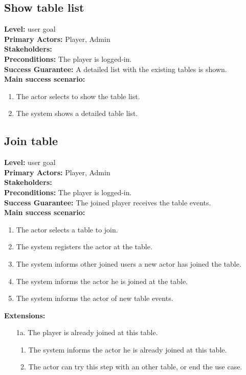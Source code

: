 \documentclass[a4paper,11pt]{report}
\begin{document}
\subsection{Show table list}
\textbf{Level:} user goal \\
\textbf{Primary Actors:} Player, Admin \\
\textbf{Stakeholders:} \\
\textbf{Preconditions:} The player is logged-in.\\
\textbf{Success Guarantee:} A detailed list with the existing tables is shown.\\
\textbf{Main success scenario:} 
\begin{enumerate}
\item The actor selects to show the table list.
\item The system shows a detailed table list.
\end{enumerate}

\subsection{Join table}
\textbf{Level:} user goal \\
\textbf{Primary Actors:} Player, Admin \\
\textbf{Stakeholders:} \\
\textbf{Preconditions:} The player is logged-in.\\
\textbf{Success Guarantee:} The joined player receives the table events. \\
\textbf{Main success scenario:} 
\begin{enumerate}
\item The actor selects a table to join. 
\item The system registers the actor at the table. 
\item The system informs other joined users a new actor has joined the table.
\item The system informs the actor he is joined at the table.
\item The system informs the actor of new table events.
\end{enumerate}
\textbf{Extensions:}
\begin{itemize}
\item[1a.] The player is already joined at this table.
\begin{enumerate}
\item The system informs the actor he is already joined at this table.
\item The actor can try this step with an other table, or end the use case.
\end{enumerate}
\end{itemize}
\end{document}
